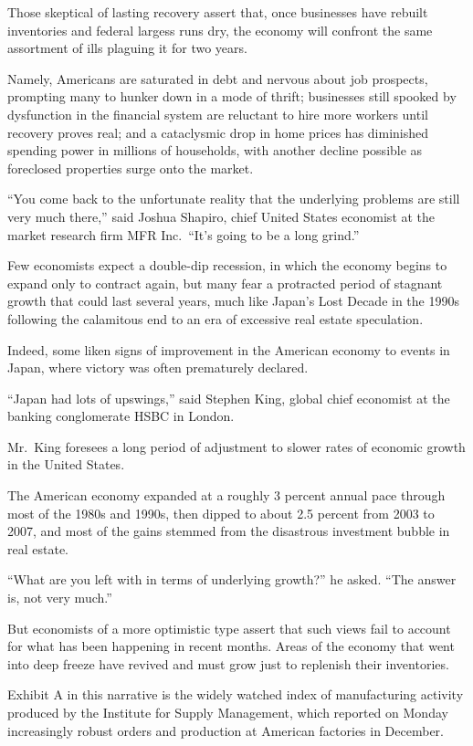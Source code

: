 ﻿\documentclass[12pt]{article}
\begin{document}
Those skeptical of lasting recovery assert that, once businesses have rebuilt inventories and
federal largess runs dry, the economy will confront the same assortment of ills plaguing it for two
years.

Namely, Americans are saturated in debt and nervous about job prospects, prompting many to hunker
down in a mode of thrift; businesses still spooked by dysfunction in the financial system are
reluctant to hire more workers until recovery proves real; and a cataclysmic drop in home prices has
diminished spending power in millions of households, with another decline possible as foreclosed
properties surge onto the market.

``You come back to the unfortunate reality that the underlying problems are still very much there,''
said Joshua Shapiro, chief United States economist at the market research firm MFR Inc.~``It's going
to be a long grind.''

Few economists expect a double-dip recession, in which the economy begins to expand only to contract
again, but many fear a protracted period of stagnant growth that could last several years, much like
Japan's Lost Decade in the 1990s following the calamitous end to an era of excessive real estate
speculation.

Indeed, some liken signs of improvement in the American economy to events in Japan, where victory
was often prematurely declared.

``Japan had lots of upswings,'' said Stephen King, global chief economist at the banking
conglomerate HSBC in London.

Mr.~King foresees a long period of adjustment to slower rates of economic growth in the United
States.

The American economy expanded at a roughly 3 percent annual pace through most of the 1980s and
1990s, then dipped to about 2.5 percent from 2003 to 2007, and most of the gains stemmed from the
disastrous investment bubble in real estate.

``What are you left with in terms of underlying growth?'' he asked. ``The answer is, not very
much.''

But economists of a more optimistic type assert that such views fail to account for what has been
happening in recent months. Areas of the economy that went into deep freeze have revived and must
grow just to replenish their inventories.

Exhibit A in this narrative is the widely watched index of manufacturing activity produced by the
Institute for Supply Management, which reported on Monday increasingly robust orders and production
at American factories in December.
\end{document}
